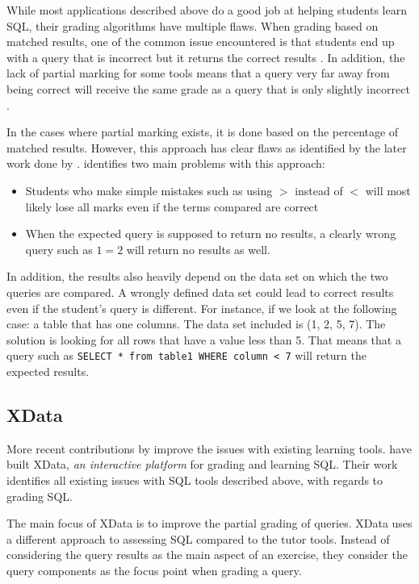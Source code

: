 While most applications described above do a good job at helping students learn SQL, their grading algorithms have multiple flaws. When grading based on matched results, one of the common issue encountered is that students end up with a query that is incorrect but it returns the correct results \citep{literature:assesql}. In addition, the lack of partial marking for some tools means that a query very far away from being correct will receive the same grade as a query that is only slightly incorrect \citep{literature:assesql}.

In the cases where partial marking exists, it is done based on the percentage of matched results. However, this approach has clear flaws as identified by the later work done by \cite{literature:xdata}. \cite{literature:xdata} identifies two main problems with this approach:

\begin{itemize}
    \item Students who make simple mistakes such as using $>$ instead of $<$ will most likely lose all marks even if the terms compared are correct
    \item When the expected query is supposed to return no results, a clearly wrong query such as $1 = 2$ will return no results as well.
\end{itemize}

In addition, the results also heavily depend on the data set on which the two queries are compared. A wrongly defined data set could lead to correct results even if the student's query is different. For instance, if we look at the following case: a table that has one columns. The data set included is (1, 2, 5, 7). The solution is looking for all rows that have a value less than 5. That means that a query such as \texttt{SELECT * from table1 WHERE column < 7} will return the expected results.

\subsection{XData}

More recent contributions by \cite{literature:xdata} improve the issues with existing learning tools. \cite{literature:xdata} have built XData, \textit{an interactive platform} for grading and learning SQL. Their work identifies all existing issues with SQL tools described above, with regards to grading SQL.

The main focus of XData is to improve the partial grading of queries. XData uses a different approach to assessing SQL compared to the tutor tools. Instead of considering the query results as the main aspect of an exercise, they consider the query components as the focus point when grading a query.

